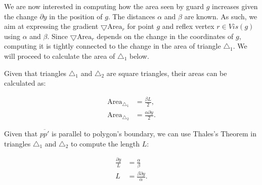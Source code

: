 

We are now interested in computing how the area seen by guard $g$ increases given the change $\partial y$ in the position of $g$. The distances $\alpha$ and $\beta$ are known. As such, we aim at expressing the gradient $\bigtriangledown \text{Area}_r$ for point $g$ and reflex vertex $r \in Vis(g)$ using $\alpha$ and $\beta$. Since $\bigtriangledown \text{Area}_r$ depends on the change in the coordinates of $g$, computing it is tightly connected to the change in the area of triangle $\triangle_1$. We will proceed to calculate the area of $\triangle_1$ below.

Given that triangles $\triangle_1$ and $\triangle_2$ are square triangles, their areas can be calculated as:

\begin{align}
    \text{Area}_{\triangle_1} &= \frac{\beta L}{2}, \label{eq:rdd}\\ 
    \text{Area}_{\triangle_2} &= \frac{\alpha \partial y}{2}. \label{eq:rpp}
\end{align}


Given that $\overline{pp'}$ is parallel to polygon's boundary, we can use Thales's Theorem in triangles $\triangle_1$ and $\triangle_2$ to compute the length $L$: 

\begin{align}
    \frac{\partial y}{L} &= \frac \alpha \beta  \label{eq:dxL} \\
    L &= \frac{\beta \partial y}{\alpha}. \label{eq:L}
\end{align}

